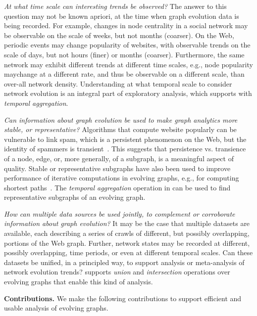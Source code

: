 {\em At what time scale can interesting trends be observed?} The
answer to this question may not be known apriori, at the time when
graph evolution data is being recorded.  For example, changes in node
centrality in a social network may be observable on the scale of
weeks, but not months (coarser).  On the Web, periodic events may
change popularity of websites, with observable trends on the scale of
days, but not hours (finer) or months (coarser).  Furthermore, the
same network may exhibit different trends at different time scales,
e.g., node popularity maychange at a different rate, and thus be
observable on a different scale, than over-all network density.
Understanding at what temporal scale to consider network evolution is
an integral part of exploratory analysis, which \ql supports with {\em
  temporal aggregation}.

{\em Can information about graph evolution be used to make graph
  analytics more stable, or representative?}  Algorithms that compute
website popularly can be vulnerable to link spam, which is a
persistent phenomenon on the Web, but the identity of spammers is
transient~\cite{DBLP:conf/cikm/YangQZGL07}.  This suggests that
persistence vs. transience of a node, edge, or, more generally, of a
subgraph, is a meaningful aspect of quality.  Stable or representative
subgraphs have also been used to improve performance of iterative
computations in evolving graphs, e.g., for computing shortest
paths~\cite{Ren2011}.  The {\em temporal aggregation} operation in \ql
{}can be used to find
representative subgraphs of an evolving graph.

{\em How can multiple data sources be used jointly, to complement or
  corroborate information about graph evolution?}  It may be the case
that multiple datasets are available, each describing a series of
crawls of different, but possibly overlapping, portions of the Web
graph.  Further, network states may be recorded at different, possibly
overlapping, time periods, or even at different temporal scales.  Can
these datasets be unified, in a principled way, to support analysis or
meta-analysis of network evolution trends?  \ql supports {\em union}
and {\em intersection} operations over evolving graphs that enable
this kind of analysis.

{\bf Contributions.} We make the following contributions to support
efficient and usable analysis of evolving graphs.

